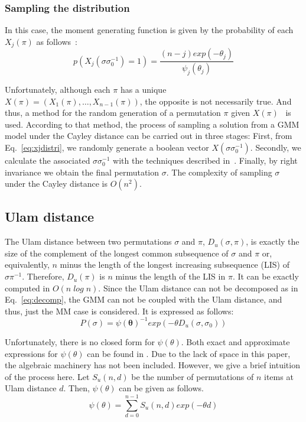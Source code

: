 \documentclass[conference]{IEEEtran}
\begin{document}
\subsubsection{Sampling the distribution}
In this case, the moment generating function is given by the probability of each $X_j(\pi)$ as follows~\cite{gMallows}:
\begin{equation}
p(X_j(\sigma \sigma_0^{-1})=1) = \frac{(n-j) exp(-\theta_j) }{\psi_j(\theta_j)}
\label{eq:xjdistri}
\end{equation}

Unfortunately, although each $\pi$ has a unique $X(\pi) = (X_1(\pi), \ldots , X_{n-1}(\pi))$, the opposite is not necessarily true. And thus, a method for the random generation of a permutation $\pi$ given $X(\pi)$~\cite{irurozki2013a} is used. According to that method, the process of sampling a solution from a GMM model under the Cayley distance can be carried out in three stages: First, from Eq.~\ref{eq:xjdistri}, we randomly generate a boolean vector $X(\sigma \sigma_0^{-1})$. Secondly, we calculate the associated $\sigma \sigma_0^{-1}$ with the techniques described in~\cite{irurozki2013a}. Finally, by right invariance we obtain the final permutation $\sigma$. The complexity of sampling $\sigma$ under the Cayley distance is $O(n^2)$.

\subsection{Ulam distance}%
The Ulam distance between two permutations $\sigma$ and $\pi$, $D_u(\sigma, \pi)$, is exactly the size of the complement of the longest common subsequence of $\sigma$ and $\pi$ or, equivalently, $n$ minus the length of the longest increasing subsequence (LIS) of $\sigma\pi^{-1}$. Therefore, $D_u(\pi)$ is $n$ minus the length of the LIS in $\pi$. It can be exactly computed in $O(n \; log \; n)$. Since the Ulam distance can not be decomposed as in Eq.~\ref{eq:decomp}, the GMM can not be coupled with the Ulam distance, and thus, just the MM case is considered. It is expressed as follows:
\begin{equation}
P(\sigma) =  \psi(\boldsymbol \theta)^{-1} exp(-\theta D_u(\sigma, \sigma_0)) 
\label{eq:mallowsU}
\end{equation}

Unfortunately, there is no closed form for $\psi(\theta)$. Both exact and approximate expressions for $\psi(\theta)$ can be found in \cite{irurozki2013b}. Due to the lack of space in this paper, the algebraic machinery has not been included. However, we give a brief intuition of the process here. Let $S_u(n,d)$ be the number of permutations of $n$ items at Ulam distance $d$. Then, $\psi(\theta)$ can be given as follows.
\begin{equation}
	\psi(\theta) = \sum _{d=0}^{n-1} S_u(n,d)  exp(-\theta d)
	\label{eq:theta_ulam}
\end{equation}
\end{document}
